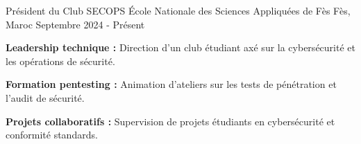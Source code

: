 \begin{cventries}
    \cventry
    {Président du Club SECOPS}
    {École Nationale des Sciences Appliquées de Fès} %
    {Fès, Maroc} %
    {Septembre 2024 - Présent} %
    {
        \begin{cvitems} %
            \item {\textbf{Leadership technique :} Direction d'un club étudiant axé sur la cybersécurité et les opérations de sécurité.}
            \item {\textbf{Formation pentesting :} Animation d'ateliers sur les tests de pénétration et l'audit de sécurité.}
            \item {\textbf{Projets collaboratifs :} Supervision de projets étudiants en cybersécurité et conformité standards.}
        \end{cvitems}
    }
\end{cventries}